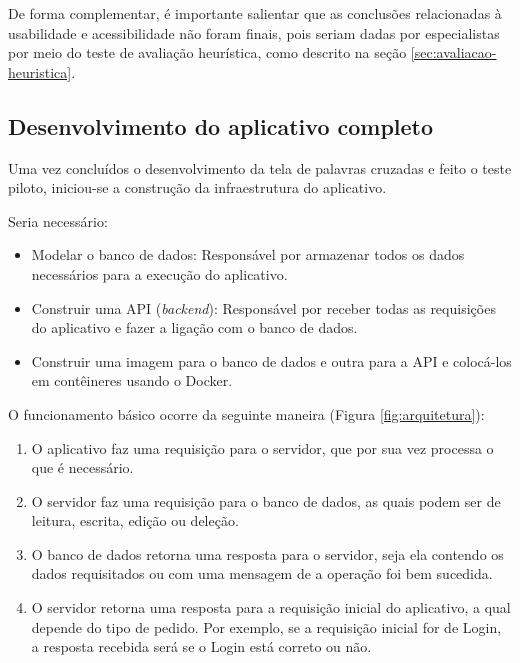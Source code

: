 De forma complementar, é importante salientar que as conclusões relacionadas à usabilidade e acessibilidade não foram finais, pois seriam dadas por especialistas por meio do teste de avaliação heurística, como descrito na seção \ref{sec:avaliacao-heuristica}.

\subsection{Desenvolvimento do aplicativo completo}
Uma vez concluídos o desenvolvimento da tela de palavras cruzadas e feito o teste piloto, iniciou-se a construção da infraestrutura do aplicativo.

Seria necessário:
\begin{itemize}
    \item Modelar o banco de dados: Responsável por armazenar todos os dados necessários para a execução do aplicativo.

    \item Construir uma API (\textit{backend}): Responsável por receber todas as requisições do aplicativo e fazer a ligação com o banco de dados.
    
    \item Construir uma imagem para o banco de dados e outra para a API e colocá-los em contêineres usando o Docker.
\end{itemize}


O funcionamento básico ocorre da seguinte maneira (Figura \ref{fig:arquitetura}):
\begin{enumerate}
    \item O aplicativo faz uma requisição para o servidor, que por sua vez processa o que é necessário.
    
    \item O servidor faz uma requisição para o banco de dados, as quais podem ser de leitura, escrita, edição ou deleção.
    
    \item O banco de dados retorna uma resposta para o servidor, seja ela contendo os dados requisitados ou com uma mensagem de a operação foi bem sucedida.
    
    \item O servidor retorna uma resposta para a requisição inicial do aplicativo, a qual depende do tipo de pedido. Por exemplo, se a requisição inicial for de Login, a resposta recebida será se o Login está correto ou não.
\end{enumerate}

